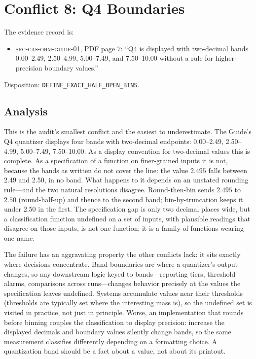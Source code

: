 \section{Conflict 8: Q4 Boundaries}\label{ch04:q4}

\begin{conflict}\label{ch04:conf:q4}
The evidence record is:
\begin{itemize}
\item \textsc{src-cas-ohm-guide-01}, PDF page 7: ``Q4 is displayed with
two-decimal bands 0.00--2.49, 2.50--4.99, 5.00--7.49, and 7.50--10.00 without
a rule for higher-precision boundary values.''
\end{itemize}
Disposition: \texttt{DEFINE\_EXACT\_HALF\_OPEN\_BINS}.
\end{conflict}

\subsection{Analysis}

This is the audit's smallest conflict and the easiest to underestimate. The
Guide's Q4 quantizer displays four bands with two-decimal endpoints:
0.00--2.49, 2.50--4.99, 5.00--7.49, 7.50--10.00. As a display convention for
two-decimal values this is complete. As a specification of a function on
finer-grained inputs it is not, because the bands as written do not cover the
line: the value $2.495$ falls between 2.49 and 2.50, in no band. What happens
to it depends on an unstated rounding rule---and the two natural
resolutions disagree. Round-then-bin sends $2.495$ to $2.50$ (round-half-up)
and thence to the second band; bin-by-truncation keeps it under $2.50$ in the
first. The specification gap is only two decimal places wide, but a
classification function undefined on a set of inputs, with plausible readings
that disagree on those inputs, is not one function; it is a family of
functions wearing one name.

The failure has an aggravating property the other conflicts lack: it sits
exactly where decisions concentrate. Band boundaries are where a quantizer's
output changes, so any downstream logic keyed to bands---reporting tiers,
threshold alarms, comparisons across runs---changes behavior precisely at the
values the specification leaves undefined. Systems accumulate values near
their thresholds (thresholds are typically set where the interesting mass
is), so the undefined set is visited in practice, not just in principle.
Worse, an implementation that rounds before binning couples the
classification to display precision: increase the displayed decimals and
boundary values silently change bands, so the same measurement classifies
differently depending on a formatting choice. A quantization band should be a
fact about a value, not about its printout.

